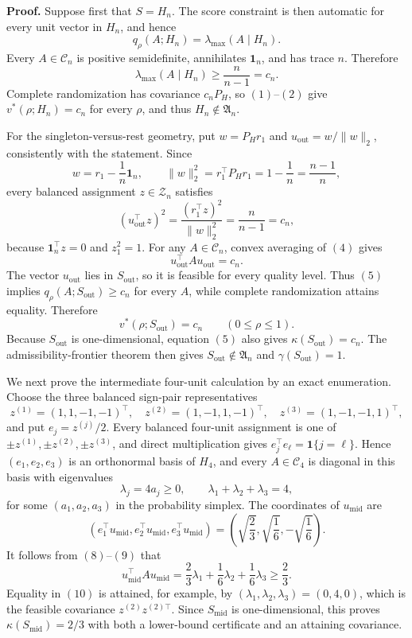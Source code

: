 \textbf{Proof.}
Suppose first that \(S=H_n\). The score constraint is then automatic for every unit vector in \(H_n\), and hence
\[
q_\rho(A;H_n)=\lambda_{\max}(A\mid H_n).
\tag{1}
\]
Every \(A\in\mathcal C_n\) is positive semidefinite, annihilates \(\mathbf1_n\), and has trace \(n\). Therefore
\[
\lambda_{\max}(A\mid H_n)\geq\frac{n}{n-1}=c_n.
\tag{2}
\]
Complete randomization has covariance \(c_nP_H\), so \((1)\)--\((2)\) give \(v^*(\rho;H_n)=c_n\) for every \(\rho\), and thus \(H_n\notin\mathfrak A_n\).

For the singleton-versus-rest geometry, put \(w=P_Hr_1\) and \(u_{\mathrm{out}}=w/\|w\|_2\), consistently with the statement. Since
\[
w=r_1-\frac1n\mathbf1_n,
\qquad
\|w\|_2^2=r_1^\top P_Hr_1=1-\frac1n=\frac{n-1}{n},
\tag{3}
\]
every balanced assignment \(z\in\mathcal Z_n\) satisfies
\[
(u_{\mathrm{out}}^\top z)^2
=\frac{(r_1^\top z)^2}{\|w\|_2^2}
=\frac{n}{n-1}=c_n,
\tag{4}
\]
because \(\mathbf1_n^\top z=0\) and \(z_1^2=1\). For any \(A\in\mathcal C_n\), convex averaging of \((4)\) gives
\[
u_{\mathrm{out}}^\top Au_{\mathrm{out}}=c_n.
\tag{5}
\]
The vector \(u_{\mathrm{out}}\) lies in \(S_{\mathrm{out}}\), so it is feasible for every quality level. Thus \((5)\) implies \(q_\rho(A;S_{\mathrm{out}})\geq c_n\) for every \(A\), while complete randomization attains equality. Therefore
\[
v^*(\rho;S_{\mathrm{out}})=c_n
\qquad(0\leq\rho\leq1).
\tag{6}
\]
Because \(S_{\mathrm{out}}\) is one-dimensional, equation \((5)\) also gives \(\kappa(S_{\mathrm{out}})=c_n\). The admissibility-frontier theorem then gives \(S_{\mathrm{out}}\notin\mathfrak A_n\) and \(\gamma(S_{\mathrm{out}})=1\).

We next prove the intermediate four-unit calculation by an exact enumeration. Choose the three balanced sign-pair representatives
\[
z^{(1)}=(1,1,-1,-1)^\top,
\quad
z^{(2)}=(1,-1,1,-1)^\top,
\quad
z^{(3)}=(1,-1,-1,1)^\top,
\tag{7}
\]
and put \(e_j=z^{(j)}/2\). Every balanced four-unit assignment is one of \(\pm z^{(1)},\pm z^{(2)},\pm z^{(3)}\), and direct multiplication gives \(e_j^\top e_\ell=\mathbf1\{j=\ell\}\). Hence \((e_1,e_2,e_3)\) is an orthonormal basis of \(H_4\), and every \(A\in\mathcal C_4\) is diagonal in this basis with eigenvalues
\[
\lambda_j=4a_j\geq0,
\qquad
\lambda_1+\lambda_2+\lambda_3=4,
\tag{8}
\]
for some \((a_1,a_2,a_3)\) in the probability simplex. The coordinates of \(u_{\mathrm{mid}}\) are
\[
(e_1^\top u_{\mathrm{mid}},e_2^\top u_{\mathrm{mid}},e_3^\top u_{\mathrm{mid}})
=\left(\sqrt{\frac23},\sqrt{\frac16},-\sqrt{\frac16}\right).
\tag{9}
\]
It follows from \((8)\)--\((9)\) that
\[
u_{\mathrm{mid}}^\top Au_{\mathrm{mid}}
=\frac23\lambda_1+\frac16\lambda_2+\frac16\lambda_3
\geq\frac23.
\tag{10}
\]
Equality in \((10)\) is attained, for example, by \((\lambda_1,\lambda_2,\lambda_3)=(0,4,0)\), which is the feasible covariance \(z^{(2)}z^{(2)\top}\). Since \(S_{\mathrm{mid}}\) is one-dimensional, this proves \(\kappa(S_{\mathrm{mid}})=2/3\) with both a lower-bound certificate and an attaining covariance.


